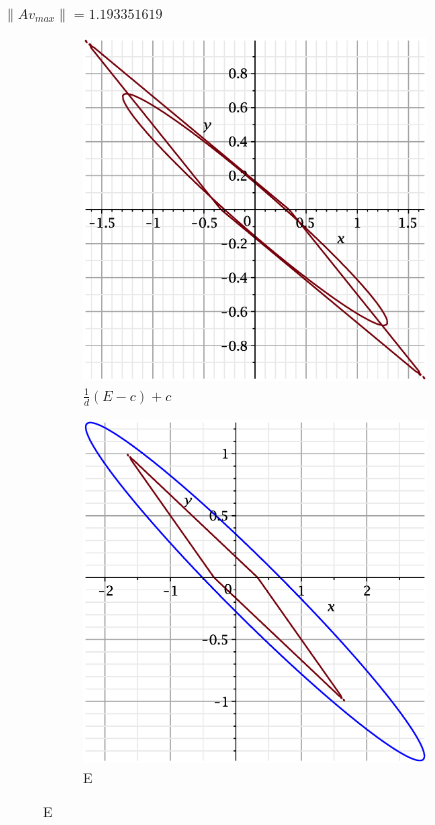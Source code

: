 \documentclass{beamer}
\begin{document}
\begin{frame}
$\|Av_{max}\| = 1.193351619$  
    \begin{figure}
    \begin{subfigure}{.5\textwidth}
        \centering
        \includegraphics[width=.8\linewidth]{pictures/6.eps}
        \caption{$\displaystyle\frac{1}{d}(E-c)+c$}
    \label{fig:sfig1}
    \end{subfigure}%
    \begin{subfigure}{.5\textwidth}
        \centering
        \includegraphics[width=.8\linewidth]{pictures/1_6.eps}
        \caption{E}
    \label{fig:sfig2}
    \end{subfigure}
\end{figure}

\end{frame}
\end{document}

